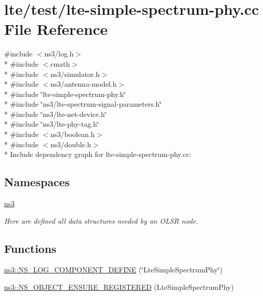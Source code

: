 \hypertarget{lte-simple-spectrum-phy_8cc}{}\section{lte/test/lte-\/simple-\/spectrum-\/phy.cc File Reference}
\label{lte-simple-spectrum-phy_8cc}
{\ttfamily \#include $<$ns3/log.\+h$>$}\\*
{\ttfamily \#include $<$cmath$>$}\\*
{\ttfamily \#include $<$ns3/simulator.\+h$>$}\\*
{\ttfamily \#include $<$ns3/antenna-\/model.\+h$>$}\\*
{\ttfamily \#include \char`\"{}lte-\/simple-\/spectrum-\/phy.\+h\char`\"{}}\\*
{\ttfamily \#include \char`\"{}ns3/lte-\/spectrum-\/signal-\/parameters.\+h\char`\"{}}\\*
{\ttfamily \#include \char`\"{}ns3/lte-\/net-\/device.\+h\char`\"{}}\\*
{\ttfamily \#include \char`\"{}ns3/lte-\/phy-\/tag.\+h\char`\"{}}\\*
{\ttfamily \#include $<$ns3/boolean.\+h$>$}\\*
{\ttfamily \#include $<$ns3/double.\+h$>$}\\*
Include dependency graph for lte-\/simple-\/spectrum-\/phy.cc\+:
\subsection*{Namespaces}
\begin{DoxyCompactItemize}
\item 
 \hyperlink{namespacens3}{ns3}
\begin{DoxyCompactList}\small\item\em Here are defined all data structures needed by an O\+L\+SR node. \end{DoxyCompactList}\end{DoxyCompactItemize}
\subsection*{Functions}
\begin{DoxyCompactItemize}
\item 
\hyperlink{namespacens3_a74f5489b08b861f2859b051aa71b9f42}{ns3\+::\+N\+S\+\_\+\+L\+O\+G\+\_\+\+C\+O\+M\+P\+O\+N\+E\+N\+T\+\_\+\+D\+E\+F\+I\+NE} (\char`\"{}Lte\+Simple\+Spectrum\+Phy\char`\"{})
\item 
\hyperlink{namespacens3_a3734f9691485b9df5ca125b9336d3be3}{ns3\+::\+N\+S\+\_\+\+O\+B\+J\+E\+C\+T\+\_\+\+E\+N\+S\+U\+R\+E\+\_\+\+R\+E\+G\+I\+S\+T\+E\+R\+ED} (Lte\+Simple\+Spectrum\+Phy)
\end{DoxyCompactItemize}
